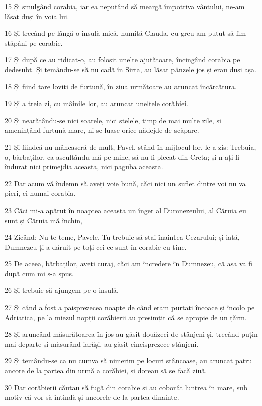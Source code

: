 \par 15 Și smulgând corabia, iar ea neputând să meargă împotriva vântului, ne-am lăsat duși în voia lui.
\par 16 Și trecând pe lângă o insulă mică, numită Clauda, cu greu am putut să fim stăpâni pe corabie.
\par 17 Și după ce au ridicat-o, au folosit unelte ajutătoare, încingând corabia pe dedesubt. Și temându-se să nu cadă în Sirta, au lăsat pânzele jos și erau duși așa.
\par 18 Și fiind tare loviți de furtună, în ziua următoare au aruncat încărcătura.
\par 19 Și a treia zi, cu mâinile lor, au aruncat uneltele corăbiei.
\par 20 Și nearătându-se nici soarele, nici stelele, timp de mai multe zile, și amenințând furtună mare, ni se luase orice nădejde de scăpare.
\par 21 Și fiindcă nu mâncaseră de mult, Pavel, stând în mijlocul lor, le-a zis: Trebuia, o, bărbaților, ca ascultându-mă pe mine, să nu fi plecat din Creta; și n-ați fi îndurat nici primejdia aceasta, nici paguba aceasta.
\par 22 Dar acum vă îndemn să aveți voie bună, căci nici un suflet dintre voi nu va pieri, ci numai corabia.
\par 23 Căci mi-a apărut în noaptea aceasta un înger al Dumnezeului, al Căruia eu sunt și Căruia mă închin,
\par 24 Zicând: Nu te teme, Pavele. Tu trebuie să stai înaintea Cezarului; și iată, Dumnezeu ți-a dăruit pe toți cei ce sunt în corabie cu tine.
\par 25 De aceea, bărbaților, aveți curaj, căci am încredere în Dumnezeu, că așa va fi după cum mi s-a spus.
\par 26 Și trebuie să ajungem pe o insulă.
\par 27 Și când a fost a paisprezecea noapte de când eram purtați încoace și încolo pe Adriatica, pe la miezul nopții corăbierii au presimțit că se apropie de un țărm.
\par 28 Și aruncând măsurătoarea în jos au găsit douăzeci de stânjeni și, trecând puțin mai departe și măsurând iarăși, au găsit cincisprezece stânjeni.
\par 29 Și temându-se ca nu cumva să nimerim pe locuri stâncoase, au aruncat patru ancore de la partea din urmă a corăbiei, și doreau să se facă ziuă.
\par 30 Dar corăbierii căutau să fugă din corabie și au coborât luntrea în mare, sub motiv că vor să întindă și ancorele de la partea dinainte.
